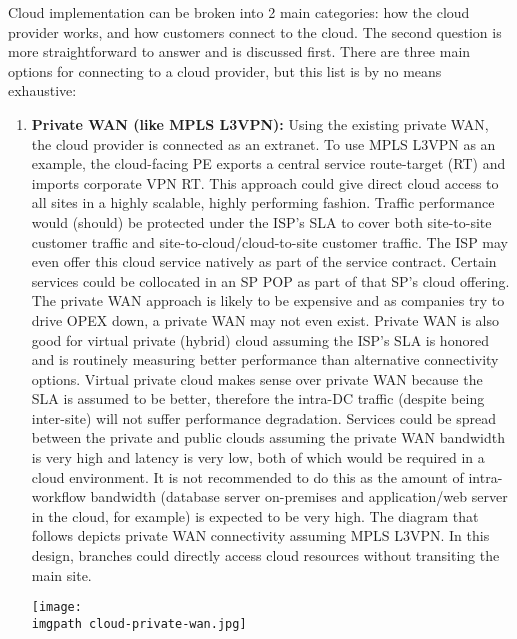 Cloud implementation can be broken into 2 main categories: how the cloud
provider works, and how customers connect to the cloud. The second question is
more straightforward to answer and is discussed first. There are three main
options for connecting to a cloud provider, but this list is by no means
exhaustive:

\begin{enumerate}
  \item \textbf{Private WAN (like MPLS L3VPN):} Using the existing private WAN, the
  cloud provider is connected as an extranet. To use MPLS L3VPN as an example,
  the cloud-facing PE exports a central service route-target (RT) and imports
  corporate VPN RT\@. This approach could give direct cloud access to all sites
  in a highly scalable, highly performing fashion. Traffic performance would
  (should) be protected under the ISP’s SLA to cover both site-to-site
  customer traffic and site-to-cloud/cloud-to-site customer traffic. The ISP
  may even offer this cloud service natively as part of the service contract.
  Certain services could be collocated in an SP POP as part of that SP's cloud
  offering. The private WAN approach is likely to be expensive and as
  companies try to drive OPEX down, a private WAN may not even exist. Private
  WAN is also good for virtual private (hybrid) cloud assuming the ISP’s SLA
  is honored and is routinely measuring better performance than alternative
  connectivity options. Virtual private cloud makes sense over private WAN
  because the SLA is assumed to be better, therefore the intra-DC traffic
  (despite being inter-site) will not suffer performance degradation. Services
  could be spread between the private and public clouds assuming the private
  WAN bandwidth is very high and latency is very low, both of which would be
  required in a cloud environment. It is not recommended to do this as the
  amount of intra-workflow bandwidth (database server on-premises and
  application/web server in the cloud, for example) is expected to be very
  high. The diagram that follows depicts private WAN connectivity
  assuming MPLS L3VPN\@. In this design, branches could directly access cloud
  resources without transiting the main site.

    \begin{minipage}[t]{\linewidth}
	  \centering
      \texttt{[image: \\imgpath cloud-private-wan.jpg]}
    \end{minipage}


\end{enumerate}
